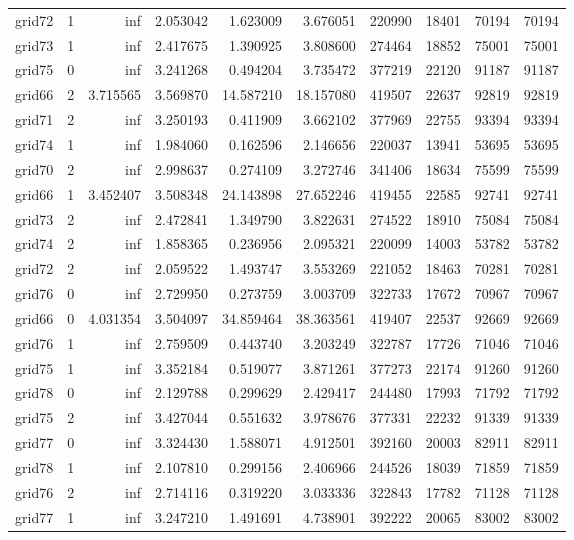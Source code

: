 \begin{longtable}{|l|r|r|r|r|r|r|r|r|r|}
grid72 & 1 & inf & 2.053042 & 1.623009 & 3.676051 & 220990 & 18401 & 70194 & 70194 \\
grid73 & 1 & inf & 2.417675 & 1.390925 & 3.808600 & 274464 & 18852 & 75001 & 75001 \\
grid75 & 0 & inf & 3.241268 & 0.494204 & 3.735472 & 377219 & 22120 & 91187 & 91187 \\
grid66 & 2 & 3.715565 & 3.569870 & 14.587210 & 18.157080 & 419507 & 22637 & 92819 & 92819 \\
grid71 & 2 & inf & 3.250193 & 0.411909 & 3.662102 & 377969 & 22755 & 93394 & 93394 \\
grid74 & 1 & inf & 1.984060 & 0.162596 & 2.146656 & 220037 & 13941 & 53695 & 53695 \\
grid70 & 2 & inf & 2.998637 & 0.274109 & 3.272746 & 341406 & 18634 & 75599 & 75599 \\
grid66 & 1 & 3.452407 & 3.508348 & 24.143898 & 27.652246 & 419455 & 22585 & 92741 & 92741 \\
grid73 & 2 & inf & 2.472841 & 1.349790 & 3.822631 & 274522 & 18910 & 75084 & 75084 \\
grid74 & 2 & inf & 1.858365 & 0.236956 & 2.095321 & 220099 & 14003 & 53782 & 53782 \\
grid72 & 2 & inf & 2.059522 & 1.493747 & 3.553269 & 221052 & 18463 & 70281 & 70281 \\
grid76 & 0 & inf & 2.729950 & 0.273759 & 3.003709 & 322733 & 17672 & 70967 & 70967 \\
grid66 & 0 & 4.031354 & 3.504097 & 34.859464 & 38.363561 & 419407 & 22537 & 92669 & 92669 \\
grid76 & 1 & inf & 2.759509 & 0.443740 & 3.203249 & 322787 & 17726 & 71046 & 71046 \\
grid75 & 1 & inf & 3.352184 & 0.519077 & 3.871261 & 377273 & 22174 & 91260 & 91260 \\
grid78 & 0 & inf & 2.129788 & 0.299629 & 2.429417 & 244480 & 17993 & 71792 & 71792 \\
grid75 & 2 & inf & 3.427044 & 0.551632 & 3.978676 & 377331 & 22232 & 91339 & 91339 \\
grid77 & 0 & inf & 3.324430 & 1.588071 & 4.912501 & 392160 & 20003 & 82911 & 82911 \\
grid78 & 1 & inf & 2.107810 & 0.299156 & 2.406966 & 244526 & 18039 & 71859 & 71859 \\
grid76 & 2 & inf & 2.714116 & 0.319220 & 3.033336 & 322843 & 17782 & 71128 & 71128 \\
grid77 & 1 & inf & 3.247210 & 1.491691 & 4.738901 & 392222 & 20065 & 83002 & 83002 \\

\end{longtable}
